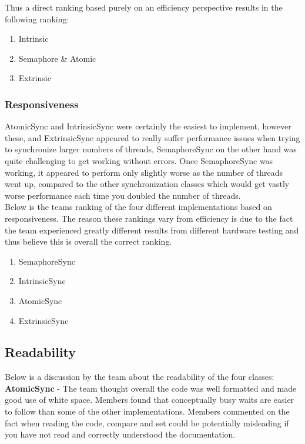 \documentclass[11pt]{article}
\begin{document}
Thus a direct ranking based purely on an efficiency perspective results in the following ranking: 

\begin{enumerate}
	\item Intrinsic
	\item Semaphore \& Atomic
	\item Extrinsic
\end{enumerate}

\subsubsection{Responsiveness}

AtomicSync and IntrinsicSync were certainly the easiest to implement, however these, and ExtrinsicSync appeared to really suffer performance issues when trying to synchronize larger numbers of threads, SemaphoreSync on the other hand was quite challenging to get working without errors. Once SemaphoreSync was working, it appeared to perform only slightly worse as the number of threads went up,  compared to the other synchronization classes which would get vastly worse performance each time you doubled the number of threads. \\

Below is the teams ranking of the four different implementations based on responsiveness. The reason these rankings vary from efficiency is due to the fact the team experienced greatly different results from different hardware testing and thus believe this is overall the correct ranking.
\begin{enumerate}
\item SemaphoreSync 
\item IntrinsicSync
\item AtomicSync
\item ExtrinsicSync

\end{enumerate}

\pagebreak
\subsection{Readability}


Below is a discussion by the team about the readability of the four classes: \\

\textbf{AtomicSync} - The team thought overall the code was well formatted and made good use of white space. Members found that conceptually busy waits are easier to follow than some of the other implementations. Members commented on the fact when reading the code, compare and set could be potentially misleading if you have not read and correctly understood the documentation.\\
\end{document}
